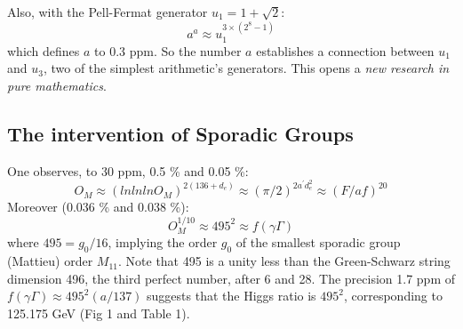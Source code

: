 \documentclass[twoside,draft]{article}
\begin{document}
\begin{sloppypar}
Also, with the Pell-Fermat generator $u_{1}
 = 1 + \sqrt{2}$:
\begin{equation}
a^{a} \approx u_1^{3\times(2^{8}-1)}
\end{equation}
which defines $a$ to 0.3 ppm. So the number $a$ establishes a connection between $u_{1}$ and $u_{3}$, two of the
simplest arithmetic's generators. This opens a \textit{new research in pure mathematics}. %



\subsection{The intervention of Sporadic Groups}

One observes, to 30 ppm, 0.5 \% and 0.05 \%:
\begin{equation}
O_{M} \approx  (lnlnlnO_{M})^{2(136 + d_e)} \approx (\pi/2)^{2a^{\prime}d_e^2} \approx (F/af)^{20}
\end{equation}
Moreover (0.036 \% and 0.038 \%):
\begin{equation}
O_{M}^{1/10} \approx 495^2 \approx f(\gamma \Gamma) 
\end{equation}
where $495 = g_0/16$, implying the order $g_0$ of the smallest  sporadic group (Mattieu) order $M_{11}$. Note that 495 is a unity less than the Green-Schwarz string dimension 496, the third perfect number, after 6 and 28. The precision 1.7 ppm of $f(\gamma \Gamma)\approx 495^2 (a/137) $ suggests that the Higgs ratio is $495^2$,
 corresponding to 125.175 GeV (Fig 1 and Table 1).


\end{sloppypar}
\end{document}
